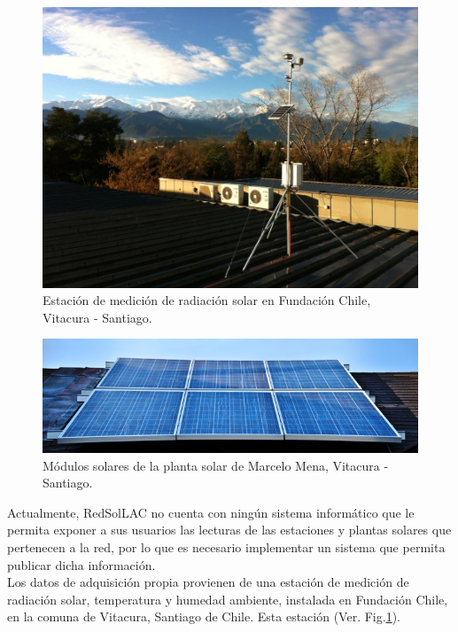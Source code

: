 \begin{figure}[h!]
        \centering
        \includegraphics[scale=0.35]{images/estacionDedaloFch}
        \caption{Estación de medición de radiación solar en Fundación Chile, Vitacura - Santiago.}
	\label{fotoEstacionFch}
\end{figure}

\begin{figure}[h!]
        \centering
        \includegraphics[scale=2.2]{images/mmena}
        \caption{Módulos solares de la planta solar de Marcelo Mena, Vitacura - Santiago.}
        \label{fotoPlantaMarcelo}
\end{figure}

Actualmente, RedSolLAC no cuenta con ningún sistema informático que le permita exponer a sus usuarios las lecturas de las estaciones y plantas solares que pertenecen a la red, por lo que es necesario implementar un sistema que permita publicar dicha información.\\

Los datos de adquisición propia provienen de una estación de medición de radiación solar, temperatura y humedad ambiente, instalada en Fundación Chile, en la comuna de Vitacura, Santiago de Chile. Esta estación (Ver. Fig.\ref{fotoEstacionFch}).

